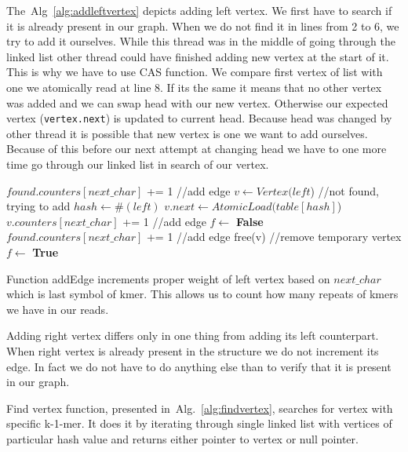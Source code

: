 \documentclass[12pt]{article}
\begin{document}
The~Alg~\ref{alg:addleftvertex} depicts adding left vertex.
We first have to search if it is already present in our graph. When we do not find it in lines from 2 to 6, we try to add it ourselves. While this thread was in the middle of going through the linked list other thread could have finished adding new vertex at the start of it. This is why we have to use CAS function. We compare first vertex of list with one we atomically read at line 8. If its the same it means that no other vertex was added and we can swap head with our new vertex. Otherwise our expected vertex (\texttt{vertex.next}) is updated to current head. Because head was changed by other thread it is possible that new vertex is one we want to add ourselves. Because of this before our next attempt at changing head we have to one more time go through our linked list in search of our vertex.

\begin{algorithm}[!htb]
\begin{algorithmic}[1]
\State $found.counters[next\_char]$ += 1 //add edge
\State \Return
\EndIf
\State $v \gets Vertex(left$) //not found, trying to add
\State $hash\gets \#(left)$
\State $v.next \gets AtomicLoad(table[hash]$)
\State $v.counters[next\_char]$ += 1 //add edge
\Do
\State $f \gets $ {\bf False}
\State $found.counters[next\_char]$ += 1 //add edge
\State free(v) //remove temporary vertex
\State $f \gets $ {\bf True}
\EndIf
{}
\EndFunction
\end{algorithmic}
\caption{Left vertex adding}
\label{alg:addleftvertex}
\end{algorithm}

Function addEdge increments proper weight of left vertex based on $next\_char$ which is last symbol of kmer. This allows us to count how many repeats of kmers we have in our reads.

Adding right vertex differs only in one thing from adding its left counterpart. When right vertex is already present in the structure we do not increment its edge. In fact we do not have to do anything else than to verify that it is present in our graph.

Find vertex function, presented in~Alg.~\ref{alg:findvertex}, searches for vertex with specific k-1-mer.
It does it by iterating through single linked list with vertices of particular hash value and returns either pointer to vertex or null pointer.
\end{document}
